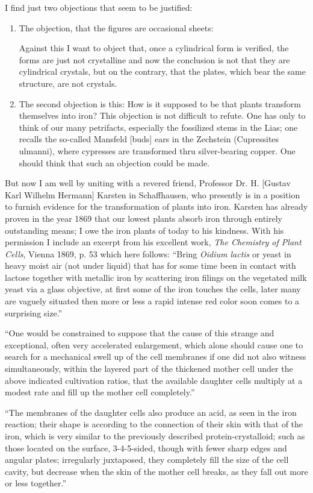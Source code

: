 \documentclass[a4paper, 12pt, oneside]{article}
\begin{document}
I find just two objections that seem to be justified:
\begin{enumerate}
    \item The objection, that the figures are occasional sheets:
    
    Against this I want to object that, once a cylindrical form is verified, the forms are just not crystalline and now the conclusion is not that they are cylindrical crystals, but on the contrary, that the plates, which bear the same structure, are not crystals.
    \item The second objection is this: How is it supposed to be that plants transform themselves into iron? This objection is not difficult to refute. One has only to think of our many petrifacts, especially the fossilized stems in the Lias; one recalls the so-called Mansfeld [buds] ears in the Zechstein (Cupressites ulmanni), where cypresses are transformed thru silver-bearing copper. One should think that such an objection could be made.
\end{enumerate}
But now I am well by uniting with a revered friend, Professor Dr. H. [Gustav Karl Wilhelm Hermann] Karsten in Schaffhausen, who presently is in a position to furnish evidence for the transformation of plants into iron. Karsten has already proven in the year 1869 that our lowest plants absorb iron through entirely outstanding means; I owe the iron plants of today to his kindness. With his permission I include an excerpt from his excellent work, \emph{The Chemistry of Plant Cells}, Vienna 1869, p. 53 which here follows: ``Bring \emph{Oidium lactis} or yeast in heavy moist air (not under liquid) that has for some time been in contact with lactose together with metallic iron by scattering iron filings on the vegetated milk yeast via a glass objective, at first some of the iron touches the cells, later many are vaguely situated then more or less a rapid intense red color soon comes to a surprising size.''

``One would be constrained to suppose that the cause of this strange and exceptional, often very accelerated enlargement, which alone should cause one to search for a mechanical swell up of the cell membranes if one did not also witness simultaneously, within the layered part of the thickened mother cell under the above indicated cultivation ratios, that the available daughter cells multiply at a modest rate and fill up the mother cell completely.''

``The membranes of the daughter cells also produce an acid, as seen in the iron reaction; their shape is according to the connection of their skin with that of the iron, which is very similar to the previously described protein-crystalloid; such as those located on the surface, 3-4-5-sided, though with fewer sharp edges and angular plates; irregularly juxtaposed, they completely fill the size of the cell cavity, but decrease when the skin of the mother cell breaks, as they fall out more or less together.''
\end{document}
